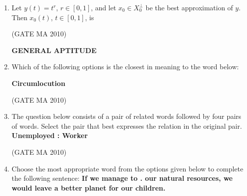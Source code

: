 \documentclass[journal,12pt,onecolumn]{IEEEtran}
\theoremstyle{remark}
\begin{document}
\begin{flushleft}
\begin{enumerate}
\item Let $y(t)=t^{r}$, $r\in[0,1]$, and let $x_{0}\in X_{0}^{\perp}$ be the best approximation of $y$. Then $x_{0}(t)$, $t\in[0,1]$, is

\hfill(GATE MA 2010)

\begin{enumerate}
\end{enumerate}
\begin{center}
    \textbf{GENERAL APTITUDE}
\end{center}
\item Which of the following options is the closest in meaning to the word below: 

\textbf{Circumlocution}

\hfill(GATE MA 2010)

\begin{enumerate}
\end{enumerate}

\item The question below consists of a pair of related words followed by four pairs of words. Select the pair that best expresses the relation in the original pair. 
\textbf{Unemployed : Worker}

\hfill(GATE MA 2010)

\begin{enumerate}
\end{enumerate}
\newpage
\item Choose the most appropriate word from the options given below to complete the following sentence: 
\textbf{If we manage to \underline{\hspace{2cm}}. our natural resources, we would leave a better planet for our children.}


\end{enumerate}
\end{flushleft}
\end{document}
